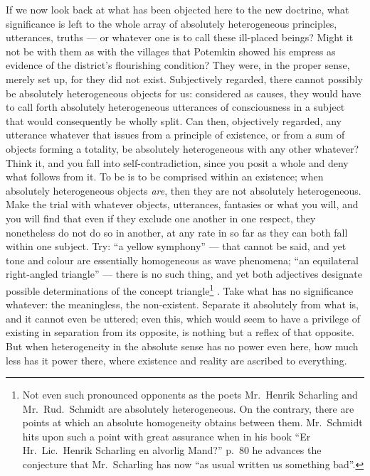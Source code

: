 \documentclass[12pt,a4paper]{book}
\renewcommand{\thefootnote}{*)}
\newcommand{\fnmark}[2]{\renewcommand{\thefootnote}{#1}\footnote{#2}%
  \renewcommand{\thefootnote}{*)}}
\newcommand{\opage}[1]{\marginnote{\footnotesize\textit{[#1]}}}
\begin{document}
If we now look back at what has been objected here to the new doctrine, what
significance is left to the whole array of absolutely heterogeneous principles,
\opage{44}utterances, truths --- or whatever one is to call these ill-placed
beings? Might it not be with them as with the villages that Potemkin showed his
empress as evidence of the district's flourishing condition? They were, in the
proper sense, merely set up, for they did not exist. Subjectively regarded,
there cannot possibly be absolutely heterogeneous objects for us: considered as
causes, they would have to call forth absolutely heterogeneous utterances of
consciousness in a subject that would consequently be wholly split. Can then,
objectively regarded, any utterance whatever that issues from a principle of
existence, or from a sum of objects forming a totality, be absolutely
heterogeneous with any other whatever? Think it, and you fall into
self-contradiction, since you posit a whole and deny what follows from it. To
be is to be comprised within an existence; when absolutely heterogeneous
objects \emph{are}, then they are not absolutely heterogeneous. Make the trial
with whatever objects, utterances, fantasies or what you will, and you will
find that even if they exclude one another in one respect, they nonetheless do
not do so in another, at any rate in so far as they can both fall within one
subject. Try: ``a yellow symphony'' --- that cannot be said, and yet tone and
colour are essentially homogeneous as wave phenomena; ``an equilateral
right-angled triangle'' --- there is no such thing, and yet both adjectives
designate possible determinations of the
\opage{45}concept triangle\fnmark{*)}{Not even such pronounced opponents as the
poets Mr.\ Henrik Scharling and Mr.\ Rud.\ Schmidt are absolutely
heterogeneous. On the contrary, there are points at which an absolute
homogeneity obtains between them. Mr.\ Schmidt hits upon such a point with
great assurance when in his book ``Er Hr.\ Lic.\ Henrik Scharling en alvorlig
Mand?'' p.\ 80 he advances the conjecture that Mr.\ Scharling has now ``as
usual written us something bad''.}. Take what has no significance whatever: the
meaningless, the non-existent. Separate it absolutely from what is, and it
cannot even be uttered; even this, which would seem to have a privilege of
existing in separation from its opposite, is nothing but a reflex of that
opposite. But when heterogeneity in the absolute sense has no power even here,
how much less has it power there, where existence and reality are ascribed to
everything.
\end{document}
